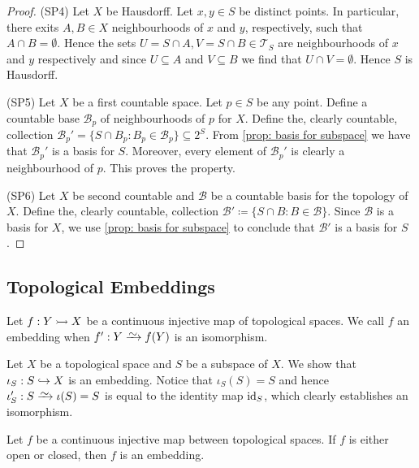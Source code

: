 \begin{proof}
(SP4) Let \(X\) be Hausdorff. Let \(x, y \in S\) be distinct points. In
particular, there exits \(A, B \in X\) neighbourhoods of \(x\) and \(y\),
respectively, such that \(A \cap B = \emptyset\). Hence the sets \(U = S \cap
A, V = S \cap B \in \mathcal T_S\) are neighbourhoods of \(x\) and \(y\)
respectively and since \(U \subseteq A\) and \(V \subseteq B\) we find that
\(U \cap V = \emptyset\). Hence \(S\) is Hausdorff.

(SP5) Let \(X\) be a first countable space. Let \(p \in S\) be any point.
Define a countable base \(\mathcal B_p\) of neighbourhoods of \(p\) for \(X\).
Define the, clearly countable, collection \(\mathcal B_p' = \{S \cap B_p \colon B_p
\in \mathcal B_p\} \subseteq 2^S\). From \cref{prop: basis for subspace} we
have that \(\mathcal B_p'\) is a basis for \(S\). Moreover, every element of
\(\mathcal B_p'\) is clearly a neighbourhood of \(p\). This proves the
property.

(SP6) Let \(X\) be second countable and \(\mathcal B\) be a countable basis
for the topology of \(X\). Define the, clearly countable, collection
\(\mathcal B' \coloneq \{S \cap B \colon B \in \mathcal B\}\). Since \(\mathcal B\) is a
basis for \(X\), we use \cref{prop: basis for subspace} to conclude that
\(\mathcal B'\) is a basis for \(S\).
\end{proof}

\subsection{Topological Embeddings}

\begin{definition}[Embedding]\label{def: topological embedding}
Let \(f: Y \rightarrowtail X\) be a continuous injective map of topological spaces. We
call \(f\) an embedding when \(f': Y \isoto f(Y)\) is an isomorphism.
\end{definition}

\begin{example}
Let \(X\) be a topological space and \(S\) be a subspace of \(X\). We show
that \(\iota_S: S \hookrightarrow X\) is an embedding. Notice that
\(\iota_S(S) = S\) and hence \(\iota_S': S \isoto \iota(S) = S\) is equal to
the identity map \(\operatorname{id}_S\), which clearly establishes an isomorphism.
\end{example}

\begin{proposition}
Let \(f\) be a continuous injective map between topological spaces. If \(f\)
is either open or closed, then \(f\) is an embedding.
\end{proposition}

